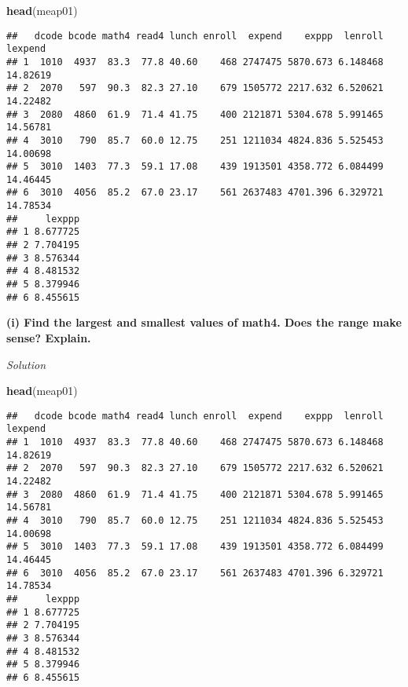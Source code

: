 \documentclass[
]{article}
\newenvironment{Shaded}{\begin{snugshade}}{\end{snugshade}}
\newcommand{\CommentTok}[1]{\textcolor[rgb]{0.56,0.35,0.01}{\textit{#1}}}
\newcommand{\KeywordTok}[1]{\textcolor[rgb]{0.13,0.29,0.53}{\textbf{#1}}}
\newcommand{\NormalTok}[1]{#1}
\newcommand{\OperatorTok}[1]{\textcolor[rgb]{0.81,0.36,0.00}{\textbf{#1}}}
\begin{document}
\begin{Shaded}
\begin{Highlighting}[]
\KeywordTok{head}\NormalTok{(meap01)}
\end{Highlighting}
\end{Shaded}

\begin{verbatim}
##   dcode bcode math4 read4 lunch enroll  expend    exppp  lenroll  lexpend
## 1  1010  4937  83.3  77.8 40.60    468 2747475 5870.673 6.148468 14.82619
## 2  2070   597  90.3  82.3 27.10    679 1505772 2217.632 6.520621 14.22482
## 3  2080  4860  61.9  71.4 41.75    400 2121871 5304.678 5.991465 14.56781
## 4  3010   790  85.7  60.0 12.75    251 1211034 4824.836 5.525453 14.00698
## 5  3010  1403  77.3  59.1 17.08    439 1913501 4358.772 6.084499 14.46445
## 6  3010  4056  85.2  67.0 23.17    561 2637483 4701.396 6.329721 14.78534
##     lexppp
## 1 8.677725
## 2 7.704195
## 3 8.576344
## 4 8.481532
## 5 8.379946
## 6 8.455615
\end{verbatim}

\textbf{(i) Find the largest and smallest values of math4. Does the
range make sense? Explain. }

\emph{Solution}

\begin{Shaded}
\begin{Highlighting}[]
\KeywordTok{head}\NormalTok{(meap01)}
\end{Highlighting}
\end{Shaded}

\begin{verbatim}
##   dcode bcode math4 read4 lunch enroll  expend    exppp  lenroll  lexpend
## 1  1010  4937  83.3  77.8 40.60    468 2747475 5870.673 6.148468 14.82619
## 2  2070   597  90.3  82.3 27.10    679 1505772 2217.632 6.520621 14.22482
## 3  2080  4860  61.9  71.4 41.75    400 2121871 5304.678 5.991465 14.56781
## 4  3010   790  85.7  60.0 12.75    251 1211034 4824.836 5.525453 14.00698
## 5  3010  1403  77.3  59.1 17.08    439 1913501 4358.772 6.084499 14.46445
## 6  3010  4056  85.2  67.0 23.17    561 2637483 4701.396 6.329721 14.78534
##     lexppp
## 1 8.677725
## 2 7.704195
## 3 8.576344
## 4 8.481532
## 5 8.379946
## 6 8.455615
\end{verbatim}

\begin{Shaded}
\end{Shaded}
\end{document}
